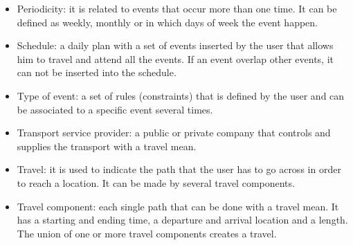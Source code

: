 \begin{itemize}
	\item Periodicity: it is related to events that occur more than one time. It can be defined as weekly, monthly or in which days of week the event happen.
	\item Schedule: a daily plan with a set of events inserted by the user that allows him to travel and attend all the events. If an event overlap other events, it can not be inserted into the schedule. 
	\item Type of event: a set of rules (constraints) that is defined by the user and can be associated to a specific event several times.
	\item Transport service provider: a public or private company that controls and supplies the transport with a travel mean. 
	\item Travel: it is used to indicate the path that the user has to go across in order to reach a location. It can be made by several travel components.
	\item Travel component: each single path that can be done with a travel mean. It has a starting and ending time, a departure and arrival location and a length. The union of one or more travel components creates a travel.
	\end{itemize}